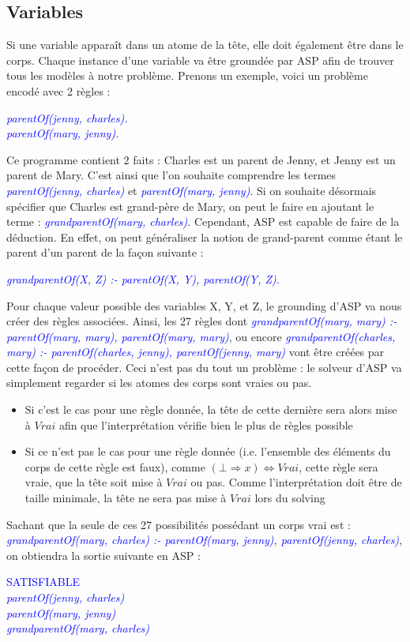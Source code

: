 \documentclass[10pt,a4paper]{article}
\begin{document}
\subsection{Variables}
Si une variable apparaît dans un atome de la tête, elle doit également être dans le corps. Chaque instance d'une variable va être groundée par ASP afin de trouver tous les modèles à notre problème.
Prenons un exemple, voici un problème encodé avec 2 règles :
\begin{center}
\emph{
	\textcolor{blue}{
  parentOf(jenny, charles).\\
  parentOf(mary, jenny).
	}
}
\end{center}
Ce programme contient 2 faits : Charles est un parent de Jenny, et Jenny est un parent de Mary. C'est ainsi que l'on souhaite comprendre les termes \textcolor{blue}{\emph{parentOf(jenny, charles)}} et 
\textcolor{blue}{\emph{parentOf(mary, jenny)}}.
Si on souhaite désormais spécifier que Charles est grand-père de Mary, on peut le faire en ajoutant le terme : \textcolor{blue}{\emph{grandparentOf(mary, charles)}}. Cependant, ASP est capable de faire de la déduction.
En effet, on peut généraliser la notion de grand-parent comme étant le parent d'un parent de la façon suivante :
\begin{center}
\emph{
	\textcolor{blue}{
  grandparentOf(X, Z) :- parentOf(X, Y), parentOf(Y, Z).
	}
}
\end{center}
Pour chaque valeur possible des variables X, Y, et Z, le grounding d'ASP va nous créer des règles associées.
Ainsi, les 27 règles dont \textcolor{blue}{\emph{grandparentOf(mary, mary) :- parentOf(mary, mary), parentOf(mary, mary)}}, ou encore \textcolor{blue}{\emph{grandparentOf(charles, mary) :- parentOf(charles, jenny), parentOf(jenny, 
mary)}} vont être créées par cette façon de procéder. Ceci n'est pas du tout un problème : le solveur d'ASP va simplement regarder si les atomes des corps sont vraies ou pas.\\
\begin{itemize}
	\item Si c'est le cas pour une règle donnée, la tête de cette dernière sera alors mise à $Vrai$ afin que l'interprétation vérifie bien le plus de règles possible
	\item Si ce n'est pas le cas pour une règle donnée (i.e. l'ensemble des éléments du corps de cette règle est faux), comme $(\bot\Rightarrow x)\Leftrightarrow Vrai$, cette règle sera vraie, que la tête soit mise à $Vrai$ 
	ou pas. Comme l'interprétation doit être de taille minimale, la tête ne sera pas mise à $Vrai$ lors du solving\\
\end{itemize}
Sachant que la seule de ces 27 possibilités possédant un corps vrai est :\\
\textcolor{blue}{\emph{grandparentOf(mary, charles) :- parentOf(mary, jenny), parentOf(jenny, charles)}}, on obtiendra la sortie suivante en ASP :
\begin{center}
\textcolor{blue}{
  SATISFIABLE\\
	\emph{
  parentOf(jenny, charles)\\
  parentOf(mary, jenny)\\
  grandparentOf(mary, charles)
	}
}
\end{center}
\end{document}
